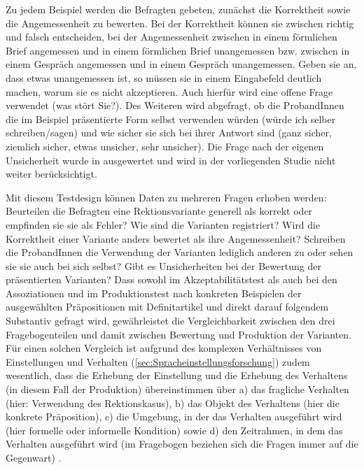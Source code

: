 Zu jedem Beispiel werden die Befragten gebeten, zunächst die Korrektheit sowie die Angemessenheit zu bewerten. 
Bei der Korrektheit können sie zwischen \glqq richtig\grqq{} und \glqq falsch\grqq{} entscheiden, bei der Angemessenheit zwischen \glqq in einem förmlichen Brief angemessen\grqq{} und \glqq in einem förmlichen Brief unangemessen\grqq{} bzw. zwischen \glqq in einem Gespräch angemessen\grqq{} und \glqq in einem Gespräch unangemessen\grqq. 
Geben sie an, dass etwas unangemessen ist, so müssen sie in einem Eingabefeld deutlich machen, warum sie es nicht akzeptieren. Auch hierfür wird eine offene Frage verwendet (\glqq was stört Sie?\grqq). 
Des Weiteren wird abgefragt, ob die ProbandInnen die im Beispiel präsentierte Form selbst verwenden würden (\glqq würde ich selber schreiben/sagen\grqq) und wie sicher sie sich bei ihrer Antwort sind (\glqq ganz sicher, ziemlich sicher, etwas unsicher, sehr unsicher\grqq). 
Die Frage nach der eigenen Unsicherheit wurde in \citet{Vieregge.2019b} ausgewertet und wird in der vorliegenden Studie nicht weiter berücksichtigt. 

Mit diesem Testdesign können Daten zu mehreren Fragen erhoben werden: Beurteilen die Befragten eine Rektionsvariante generell als korrekt oder empfinden sie sie als Fehler? 
Wie sind die Varianten registriert? 
Wird die Korrektheit einer Variante anders bewertet als ihre Angemessenheit? 
Schreiben die ProbandInnen die Verwendung der Varianten lediglich anderen zu oder sehen sie sie auch bei sich selbst? 
Gibt es Unsicherheiten bei der Bewertung der präsentierten Varianten? 
Dass sowohl im Akzeptabilitätstest als auch bei den Assoziationen und im Produktionstest nach konkreten Beispielen der ausgewählten Präpositionen mit Definitartikel und direkt darauf folgendem Substantiv gefragt wird, gewährleistet die Vergleichbarkeit zwischen den drei Fragebogenteilen und damit zwischen Bewertung und Produktion der Varianten. 
Für einen solchen Vergleich ist aufgrund des komplexen Verhältnisses von Einstellungen und Verhalten (\autoref{sec:Spracheinstellungsforschung}) zudem  wesentlich, dass die Erhebung der Einstellung und die Erhebung des Verhaltens (in diesem Fall der Produktion) übereinstimmen über a) das fragliche Verhalten (hier: Verwendung des Rektionskasus), b) das Objekt des Verhaltens (hier die konkrete Präposition), c) die Umgebung, in der das Verhalten ausgeführt wird (hier formelle oder informelle Kondition) sowie d) den Zeitrahmen, in dem das Verhalten ausgeführt wird (im Fragebogen beziehen sich die Fragen immer auf die Gegenwart) \citep[s.][219]{Jonas.2014}. 
